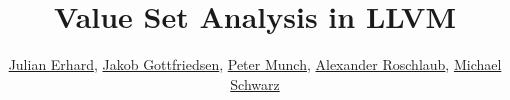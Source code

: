 \documentclass[10pt,handout]{beamer}
\author{\href{mailto:julian.erhard@tum.de}{Julian Erhard}, \href{mailto:j.gottfriedsen@tum.de}{Jakob Gottfriedsen}, \href{mailto:petermuench@mytum.de}{Peter Munch}, \href{mailto:a.roschlaub@tum.de}{Alexander Roschlaub}, \href{mailto:m.schwarz@tum.de}{Michael Schwarz}}
\title{Value Set Analysis in LLVM}
\institute{IN2053 - Program Optimization Lab 2018}
\begin{document}
\begin{frame}
\titlepage
\end{frame}


\newcommand{\linen}[2]{ &&\qquad #1 & #2 \\}
\newcommand{\linenn}[4]{#1 & #2 &\qquad #3 & #4 \\}
\newcommand{\linel}[1]{ &&#1 \\}

\usetikzlibrary{decorations.text}
\newcommand*{\mytextstylee}{\sffamily\bfseries\color{white!85}}
\newcommand*{\mytextstyle}{\sffamily\bfseries\color{black!85}}
\newcommand{\arcarrow}[3]{%
   \pgfmathsetmacro{\rin}{2.5}
   \pgfmathsetmacro{\rmid}{3.0}
   \pgfmathsetmacro{\rout}{3.5}
   \pgfmathsetmacro{\astart}{#1}
   \pgfmathsetmacro{\aend}{#2}
   \pgfmathsetmacro{\atip}{5}
   \fill[mygray, very thick] (\astart+\atip:\rin)
                         arc (\astart+\atip:\aend:\rin)
      -- (\aend-\atip:\rmid)
      -- (\aend:\rout)   arc (\aend:\astart+\atip:\rout)
      -- (\astart:\rmid) -- cycle;
   \path[
      decoration = {
         text along path,
         text = {|\mytextstyle|#3},
         text align = {align = center},
         raise = -1.0ex
      },
      decorate
   ](\astart+\atip:\rmid) arc (\astart+\atip:\aend+\atip:\rmid);
}
\newcommand{\arcarroww}[3]{%
   \pgfmathsetmacro{\rin}{2.5}
   \pgfmathsetmacro{\rmid}{3.0}
   \pgfmathsetmacro{\rout}{3.5}
   \pgfmathsetmacro{\astart}{#1}
   \pgfmathsetmacro{\aend}{#2}
   \pgfmathsetmacro{\atip}{5}
   \fill[blue, very thick] (\astart+\atip:\rin)
                         arc (\astart+\atip:\aend:\rin)
      -- (\aend-\atip:\rmid)
      -- (\aend:\rout)   arc (\aend:\astart+\atip:\rout)
      -- (\astart:\rmid) -- cycle;
   \path[
      decoration = {
         text along path,
         text = {|\mytextstylee|#3},
         text align = {align = center},
         raise = -1.0ex
      },
      decorate
   ](\astart+\atip:\rmid) arc (\astart+\atip:\aend+\atip:\rmid);
}





\begin{frame}
\titlepage
\end{frame}
\end{document}
